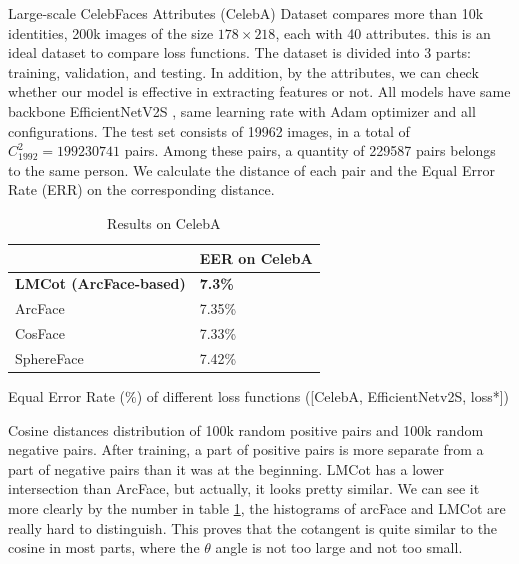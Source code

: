 Large-scale CelebFaces Attributes (CelebA) Dataset \cite{liu2015faceattributes} compares more than 10k identities, 200k images of the size $178\times218$, each with 40 attributes. this is an ideal dataset to compare loss functions. The dataset is divided into 3 parts: training, validation, and testing. In addition, by the attributes, we can check whether our model is effective in extracting features or not. All models have same backbone EfficientNetV2S \cite{tan2019efficientnet, tan2021efficientnetv2}, same learning rate with Adam optimizer and all configurations. The test set consists of 19962 images, in a total of $C_{1992}^{2}=199230741$ pairs. Among these pairs, a quantity of 229587 pairs belongs to the same person. We calculate the distance of each pair and the Equal Error Rate (ERR) on the corresponding distance.
\begin{table}[htbp]
\caption{Results on CelebA}
\label{table02}
\begin{center}
\begin{threeparttable}
    \begin{tabular}{|l|l|}
    \hline
                                   & EER on CelebA  \\ \hline
    \textbf{LMCot (ArcFace-based)} & \textbf{7.3\%} \\ \hline
    ArcFace                        & 7.35\%         \\ \hline
    CosFace                        & 7.33\%         \\ \hline
    SphereFace                     & 7.42\%         \\ \hline
    \end{tabular}
    
    \begin{tablenotes}
      \small
      \item Equal Error Rate (\%) of different loss functions ([CelebA, EfficientNetv2S, loss*])
    \end{tablenotes}
\end{threeparttable}
\end{center}
\end{table}

Cosine distances distribution of 100k random positive pairs and 100k random negative pairs. After training, a part of positive pairs is more separate from a part of negative pairs than it was at the beginning. LMCot has a lower intersection than ArcFace, but actually, it looks pretty similar. We can see it more clearly by the number in table \ref{table02}, the histograms of arcFace and LMCot are really hard to distinguish. This proves that the cotangent is quite similar to the cosine in most parts, where the $\theta$ angle is not too large and not too small.


